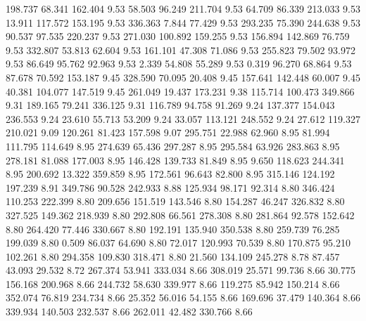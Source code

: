  198.737   68.341  162.404         9.53
  58.503   96.249  211.704         9.53
  64.709   86.339  213.033         9.53
  13.911  117.572  153.195         9.53
 336.363    7.844   77.429         9.53
 293.235   75.390  244.638         9.53
  90.537   97.535  220.237         9.53
 271.030  100.892  159.255         9.53
 156.894  142.869   76.759         9.53
 332.807   53.813   62.604         9.53
 161.101   47.308   71.086         9.53
 255.823   79.502   93.972         9.53
  86.649   95.762   92.963         9.53
   2.339   54.808   55.289         9.53
   0.319   96.270   68.864         9.53
  87.678   70.592  153.187         9.45
 328.590   70.095   20.408         9.45
 157.641  142.448   60.007         9.45
  40.381  104.077  147.519         9.45
 261.049   19.437  173.231         9.38
 115.714  100.473  349.866         9.31
 189.165   79.241  336.125         9.31
 116.789   94.758   91.269         9.24
 137.377  154.043  236.553         9.24
  23.610   55.713   53.209         9.24
  33.057  113.121  248.552         9.24
  27.612  119.327  210.021         9.09
 120.261   81.423  157.598         9.07
 295.751   22.988   62.960         8.95
  81.994  111.795  114.649         8.95
 274.639   65.436  297.287         8.95
 295.584   63.926  283.863         8.95
 278.181   81.088  177.003         8.95
 146.428  139.733   81.849         8.95
   9.650  118.623  244.341         8.95
 200.692   13.322  359.859         8.95
 172.561   96.643   82.800         8.95
 315.146  124.192  197.239         8.91
 349.786   90.528  242.933         8.88
 125.934   98.171   92.314         8.80
 346.424  110.253  222.399         8.80
 209.656  151.519  143.546         8.80
 154.287   46.247  326.832         8.80
 327.525  149.362  218.939         8.80
 292.808   66.561  278.308         8.80
 281.864   92.578  152.642         8.80
 264.420   77.446  330.667         8.80
 192.191  135.940  350.538         8.80
 259.739   76.285  199.039         8.80
   0.509   86.037   64.690         8.80
  72.017  120.993   70.539         8.80
 170.875   95.210  102.261         8.80
 294.358  109.830  318.471         8.80
  21.560  134.109  245.278         8.78
  87.457   43.093   29.532         8.72
 267.374   53.941  333.034         8.66
 308.019   25.571   99.736         8.66
  30.775  156.168  200.968         8.66
 244.732   58.630  339.977         8.66
 119.275   85.942  150.214         8.66
 352.074   76.819  234.734         8.66
  25.352   56.016   54.155         8.66
 169.696   37.479  140.364         8.66
 339.934  140.503  232.537         8.66
 262.011   42.482  330.766         8.66
